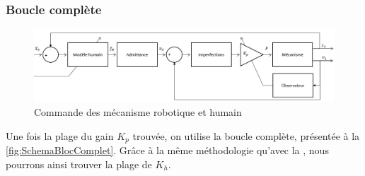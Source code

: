 \documentclass[a4paper,12pt]{article}
\begin{document}
    \subsubsection{Boucle complète}
    \begin{figure}[h!]
        \centering
        \includegraphics[width=14cm]{./img/cmd_meca_rob_hum.png}
        \caption{Commande des mécanisme robotique et humain}
        \label{fig:SchemaBlocComplet}
    \end{figure}
    
    Une fois la plage du gain $K_p$ trouvée, on utilise la boucle complète, présentée à la \autoref{fig:SchemaBlocComplet}. Grâce à la même méthodologie qu'avec la , nous pourrons ainsi trouver la plage de $K_h$.
    
\end{document}
